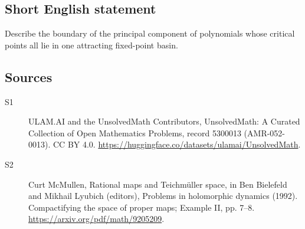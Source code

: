 \documentclass[11pt]{article}
\begin{document}
\subsection{Short English statement}
Describe the boundary of the principal component of polynomials whose critical points all lie in one attracting fixed-point basin.
\subsection{Sources}
\begin{description}
\item[\hypertarget{source:5300013:1}{S1}] ULAM.AI and the UnsolvedMath Contributors, UnsolvedMath: A Curated Collection of Open Mathematics Problems, record 5300013 (AMR-052-0013). CC BY 4.0. \url{https://huggingface.co/datasets/ulamai/UnsolvedMath}.
\item[\hypertarget{source:5300013:2}{S2}] Curt McMullen, Rational maps and Teichmüller space, in Ben Bielefeld and Mikhail Lyubich (editors), Problems in holomorphic dynamics (1992). Compactifying the space of proper maps; Example II, pp. 7–8. \url{https://arxiv.org/pdf/math/9205209}.
\end{description}
\label{end:5300013}
\end{document}
